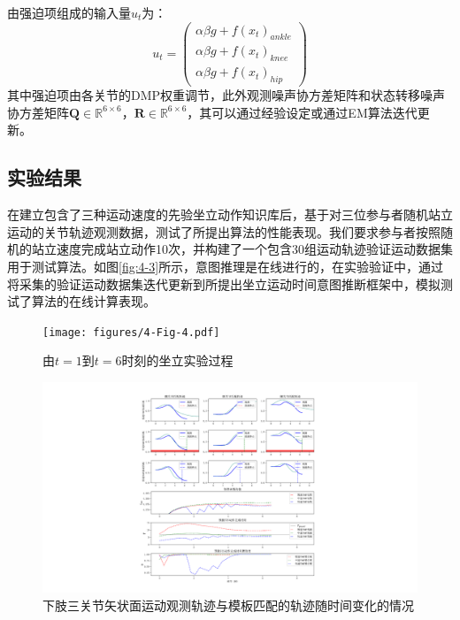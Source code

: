 由强迫项组成的输入量$u_t$为：
\begin{equation}
    u_t=\left(\begin{array}{l}
        \alpha \beta g+ f\left(x_t\right)_{ankle}\\
        \alpha \beta g+ f\left(x_t\right)_{knee}\\
        \alpha \beta g+ f\left(x_t\right)_{hip}
    \end{array}\right)
    \label{eq:4-43}
\end{equation}
其中强迫项由各关节的DMP权重调节，此外观测噪声协方差矩阵和状态转移噪声协方差矩阵$\mathbf{Q}\in \mathbb{R}^{6 \times 6}$，$\mathbf{R}\in \mathbb{R}^{6 \times 6}$，其可以通过经验设定或通过EM算法迭代更新\cite{bishopPatternRecognitionMachine2006}。

\subsection{实验结果} 
在建立包含了三种运动速度的先验坐立动作知识库后，基于对三位参与者随机站立运动的关节轨迹观测数据，测试了所提出算法的性能表现。我们要求参与者按照随机的站立速度完成站立动作10次，并构建了一个包含30组运动轨迹验证运动数据集用于测试算法。如图\ref{fig:4-3}所示，意图推理是在线进行的，在实验验证中，通过将采集的验证运动数据集迭代更新到所提出坐立运动时间意图推断框架中，模拟测试了算法的在线计算表现。
\begin{figure}[htb]
    \centering\texttt{[image: figures/4-Fig-4.pdf]}
    \caption{由$t=1$到$t=6$时刻的坐立实验过程}
    \label{fig:4-4}
\end{figure}

\begin{figure}[!t]
    \centering
    {
        \begin{minipage}{9.5in}
            \centering
            \includegraphics[width=\textwidth]{figures/4-Fig-5.pdf}
            \caption{下肢三关节矢状面运动观测轨迹与模板匹配的轨迹随时间变化的情况}
        \label{fig:4-5}
        \end{minipage}
    }
\end{figure}

